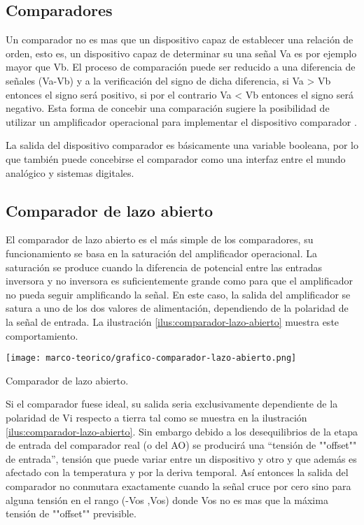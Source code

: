 \subsection{Comparadores}

Un comparador no es mas que un dispositivo capaz de establecer una relación de orden, esto es, un dispositivo capaz de determinar su una señal Va es por ejemplo mayor que Vb. El proceso de comparación puede ser reducido a una diferencia de señales (Va-Vb) y a la verificación del signo de dicha diferencia, si Va > Vb entonces el signo será positivo, si por el contrario Va < Vb entonces el signo será negativo. Esta forma de concebir una comparación sugiere la posibilidad de utilizar un amplificador operacional para implementar el dispositivo comparador \cite[pag. 2]{rivero-ao}.

La salida del dispositivo comparador es básicamente una variable booleana, por lo que también puede concebirse el comparador como una interfaz entre el mundo analógico y sistemas digitales.

\subsection{Comparador de lazo abierto}

El comparador de lazo abierto es el más simple de los comparadores, su funcionamiento se basa en la saturación del amplificador operacional. La saturación se produce cuando la diferencia de potencial entre las entradas inversora y no inversora es suficientemente grande como para que el amplificador no pueda seguir amplificando la señal. En este caso, la salida del amplificador se satura a uno de los dos valores de alimentación, dependiendo de la polaridad de la señal de entrada. La ilustración \ref{ilus:comparador-lazo-abierto} muestra este comportamiento.

\begin{ilustracion}[ht]
\centering
\texttt{[image: marco-teorico/grafico-comparador-lazo-abierto.png]}
\caption{Comparador de lazo abierto.}
\label{ilus:comparador-lazo-abierto}
\end{ilustracion}

Si el comparador fuese ideal, su salida seria exclusivamente dependiente de la polaridad de Vi respecto a tierra tal como se muestra en la ilustración \ref{ilus:comparador-lazo-abierto}.  Sin embargo debido a los desequilibrios de la etapa de entrada del comparador real (o del AO) se producirá una “tensión de ""offset"" de entrada”, tensión que puede variar entre un dispositivo y otro y que además es afectado con la temperatura y por la deriva temporal. Así entonces la salida del comparador no conmutara exactamente cuando la señal cruce por cero sino para alguna tensión en el rango (-Vos ,Vos) donde Vos no es mas que la máxima tensión de ""offset"" previsible.

